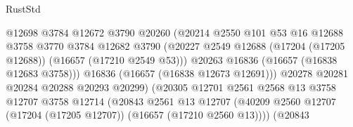 \begin{lexlean}{RustStd}
\begin{coremodule}
                                          @12698
                                          @3784
                                          @12672
                                          @3790
                                          @20260
                                          (@20214
                                            @2550
                                            @101
                                            @53
                                            @16
                                            @12688
                                            @3758
                                            @3770
                                            @3784
                                            @12682
                                            @3790
                                            (@20227
                                              @2549
                                              @12688
                                              (@17204 (@17205 @12688))
                                              (@16657 (@17210 @2549 @53)))
                                            @20263
                                            @16836
                                            (@16657 (@16838 @12683 @3758)))
                                          @16836
                                          (@16657 (@16838 @12673 @12691)))
                                        @20278
                                        @20281
                                        @20284
                                        @20288
                                        @20293
                                        @20299)
                                      (@20305
                                        @12701
                                        @2561
                                        @2568
                                        @13
                                        @3758
                                        @12707
                                        @3758
                                        @12714
                                        (@20843
                                          @2561
                                          @13
                                          @12707
                                          (@40209
                                            @2560
                                            @12707
                                            (@17204 (@17205 @12707))
                                            (@16657 (@17210 @2560 @13))))
                                        (@20843

\end{coremodule}
\end{lexlean}
